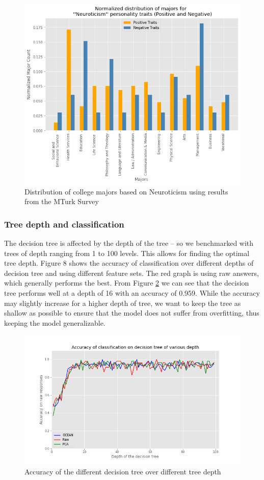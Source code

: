 \documentclass[conference]{IEEEtran}
\begin{document}
\begin{figure}[h]
\includegraphics[scale=0.4]{figs/n.png}
\caption{Distribution of college majors based on Neuroticism  using results from the MTurk Survey}
\label{fig:n}
\centering
\end{figure}


\subsubsection{Tree depth and classification}\label{subsubsec2}
The decision tree is affected by the depth of the tree – so we benchmarked with
trees of depth ranging from 1 to 100 levels. This allows for finding the optimal tree
depth. Figure 8 shows the accuracy of classification over different depths of decision
tree and using different feature sets. The red graph is using raw answers, which
generally performs the best.
From Figure  \ref{fig:USUall3} we can see that the decision tree performs well at a depth of 16 with an
accuracy of 0.959. While the accuracy may slightly increase for a higher depth of tree,
we want to keep the tree as shallow as possible to ensure that the model does not suffer
from overfitting, thus keeping the model generalizable.

\begin{figure}[h]
\includegraphics[scale=0.4]{figs/USUall3.png}
\caption{Accuracy of the different decision tree over different tree depth}
\label{fig:USUall3}
\centering
\end{figure}
\end{document}
